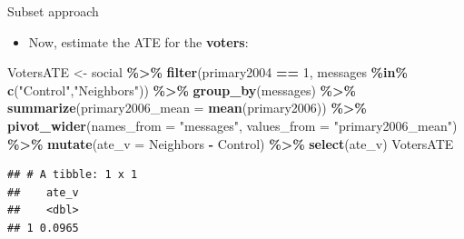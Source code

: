 \documentclass[
  ignorenonframetext,
]{beamer}
\newenvironment{Shaded}{\begin{snugshade}}{\end{snugshade}}
\newcommand{\AttributeTok}[1]{\textcolor[rgb]{0.13,0.29,0.53}{#1}}
\newcommand{\DecValTok}[1]{\textcolor[rgb]{0.00,0.00,0.81}{#1}}
\newcommand{\FunctionTok}[1]{\textcolor[rgb]{0.13,0.29,0.53}{\textbf{#1}}}
\newcommand{\NormalTok}[1]{#1}
\newcommand{\OtherTok}[1]{\textcolor[rgb]{0.56,0.35,0.01}{#1}}
\newcommand{\SpecialCharTok}[1]{\textcolor[rgb]{0.81,0.36,0.00}{\textbf{#1}}}
\newcommand{\StringTok}[1]{\textcolor[rgb]{0.31,0.60,0.02}{#1}}
\providecommand{\tightlist}{%
  \setlength{\itemsep}{0pt}\setlength{\parskip}{0pt}}
\begin{document}
\begin{frame}[fragile]{Subset approach}
\label{subset-approach-1}
\begin{itemize}
\tightlist
\item
  Now, estimate the ATE for the \textbf{voters}: \pause
\end{itemize}

\footnotesize

\begin{Shaded}
\begin{Highlighting}[]
\NormalTok{VotersATE }\OtherTok{\textless{}{-}}\NormalTok{ social }\SpecialCharTok{\%\textgreater{}\%}
  \FunctionTok{filter}\NormalTok{(primary2004 }\SpecialCharTok{==} \DecValTok{1}\NormalTok{,}
\NormalTok{         messages }\SpecialCharTok{\%in\%} \FunctionTok{c}\NormalTok{(}\StringTok{"Control"}\NormalTok{,}\StringTok{"Neighbors"}\NormalTok{)) }\SpecialCharTok{\%\textgreater{}\%}
  \FunctionTok{group\_by}\NormalTok{(messages) }\SpecialCharTok{\%\textgreater{}\%}
  \FunctionTok{summarize}\NormalTok{(}\AttributeTok{primary2006\_mean =} \FunctionTok{mean}\NormalTok{(primary2006)) }\SpecialCharTok{\%\textgreater{}\%}
  \FunctionTok{pivot\_wider}\NormalTok{(}\AttributeTok{names\_from =} \StringTok{"messages"}\NormalTok{,}
              \AttributeTok{values\_from =} \StringTok{"primary2006\_mean"}\NormalTok{) }\SpecialCharTok{\%\textgreater{}\%}
  \FunctionTok{mutate}\NormalTok{(}\AttributeTok{ate\_v =}\NormalTok{ Neighbors }\SpecialCharTok{{-}}\NormalTok{ Control) }\SpecialCharTok{\%\textgreater{}\%}
  \FunctionTok{select}\NormalTok{(ate\_v)}
\NormalTok{VotersATE}
\end{Highlighting}
\end{Shaded}

\begin{verbatim}
## # A tibble: 1 x 1
##    ate_v
##    <dbl>
## 1 0.0965
\end{verbatim}
\end{frame}
\end{document}
